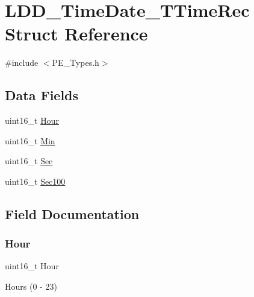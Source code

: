 \hypertarget{struct_l_d_d___time_date___t_time_rec}{}\section{L\+D\+D\+\_\+\+Time\+Date\+\_\+\+T\+Time\+Rec Struct Reference}
\label{struct_l_d_d___time_date___t_time_rec}


{\ttfamily \#include $<$P\+E\+\_\+\+Types.\+h$>$}

\subsection*{Data Fields}
\begin{DoxyCompactItemize}
\item 
uint16\+\_\+t \hyperlink{struct_l_d_d___time_date___t_time_rec_a8370c8d073395aecb475f73cf6dc3455}{Hour}
\item 
uint16\+\_\+t \hyperlink{struct_l_d_d___time_date___t_time_rec_af0bdb24d1bbf8e193ccfe472e3a14a6f}{Min}
\item 
uint16\+\_\+t \hyperlink{struct_l_d_d___time_date___t_time_rec_a2da653b2fd16ee071ec050945848fc1d}{Sec}
\item 
uint16\+\_\+t \hyperlink{struct_l_d_d___time_date___t_time_rec_a408d3a938e468be68cc1fc9c88a28470}{Sec100}
\end{DoxyCompactItemize}


\subsection{Field Documentation}
\mbox{\label{struct_l_d_d___time_date___t_time_rec_a8370c8d073395aecb475f73cf6dc3455}} 
\subsubsection{\texorpdfstring{Hour}{Hour}}
{\footnotesize\ttfamily uint16\+\_\+t Hour}

Hours (0 -\/ 23) \mbox{\label{struct_l_d_d___time_date___t_time_rec_af0bdb24d1bbf8e193ccfe472e3a14a6f}} 
